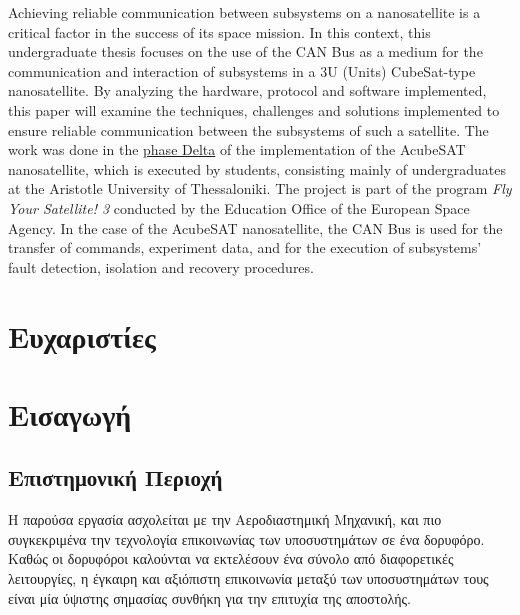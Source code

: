 \documentclass[a4paper,nobib,justified]{tufte-book}
\makeatletter
\renewcommand\mainmatter{%
	\if@openright%
	\cleardoublepage%
	\else%
	\clearpage%
	\fi%
	\@mainmattertrue%
	\fancyhf{}%
	\ifthenelse{\boolean{@tufte@twoside}}%
	{%
		\renewcommand{\chaptermark}[1]{\markboth{##1}{}}%
		\fancyhead[LE]{\thepage\quad\smallcaps{\newlinetospace{\removeaccent{\plaintitle}}}}%
		\fancyhead[RO]{\smallcaps{\newlinetospace{\removeaccent{\leftmark}}}\quad\thepage}%
	}%
	{%
		\fancyhead[RE,RO]{\smallcaps{\newlinetospace{\removeaccent{\plaintitle}}}\quad\thepage}%
	}%
}
\makeatother
\begin{document}
\begin{fullwidth}
	\centering
	\begin{minipage}{107mm}
		\justify
		Achieving reliable communication between subsystems on a nanosatellite is a critical factor in the success of its space mission. In this context, this undergraduate thesis focuses on the use of the CAN Bus as a medium for the communication and interaction of subsystems in a 3U (Units) CubeSat-type nanosatellite. By analyzing the hardware, protocol and software implemented, this paper will examine the techniques, challenges and solutions implemented to ensure reliable communication between the subsystems of such a satellite. The work was done in the \href{https://www.esa.int/Education/CubeSats_-_Fly_Your_Satellite/FYS_-_Programme_phases}{phase Delta} of the implementation of the AcubeSAT nanosatellite, which is executed by students, consisting mainly of undergraduates at the Aristotle University of Thessaloniki. The project is part of the program \emph{Fly Your Satellite! 3} conducted by the Education Office of the European Space Agency. In the case of the AcubeSAT nanosatellite, the CAN Bus is used for the transfer of commands, experiment data, and for the execution of subsystems' fault detection, isolation and recovery procedures.
	\end{minipage}
\end{fullwidth}
\chapter*{Ευχαριστίες}

\g{%
}

\mainmatter

\chapter{Εισαγωγή}
\section{Επιστημονική Περιοχή}
Η παρούσα εργασία ασχολείται με την Αεροδιαστημική Μηχανική, και πιο συγκεκριμένα την τεχνολογία επικοινωνίας των υποσυστημάτων σε ένα δορυφόρο. Καθώς οι δορυφόροι καλούνται να εκτελέσουν ένα σύνολο από διαφορετικές λειτουργίες, η έγκαιρη και αξιόπιστη επικοινωνία μεταξύ των υποσυστημάτων τους είναι μία ύψιστης σημασίας συνθήκη για την επιτυχία της αποστολής.
\end{document}
